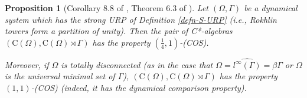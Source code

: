 \documentclass[12pt, oneside, psamsfonts]{amsart}
\newtheorem{prop}[thm]{Proposition}
\theoremstyle{definition}
\theoremstyle{remark}
\numberwithin{equation}{section}
\begin{document}
\begin{prop}[Corollary 8.8 of \cite{Niu-MD-Z}, Theorem 6.3 of \cite{DZ-comparison}]\label{cos}
Let $(\Omega, \Gamma)$ be a dynamical system which has the strong URP of Definition \ref{defn-S-URP} (i.e., Rokhlin towers form a partition of unity). Then the pair of C*-algebras $(\mathrm{C}(\Omega), \mathrm{C}(\Omega) \rtimes \Gamma)$  has the property $(\frac{1}{4}, 1)$-(COS).

Moreover, if $\Omega$ is totally disconnected (as in the case that $\Omega = \widehat{l^\infty(\Gamma)} = \beta\Gamma$ or $\Omega$ is the universal minimal set of $\Gamma$), $(\mathrm{C}(\Omega), \mathrm{C}(\Omega) \rtimes \Gamma)$  has the property $(1, 1)$-(COS) (indeed, it has the dynamical comparison property).

\end{prop}
\end{document}
